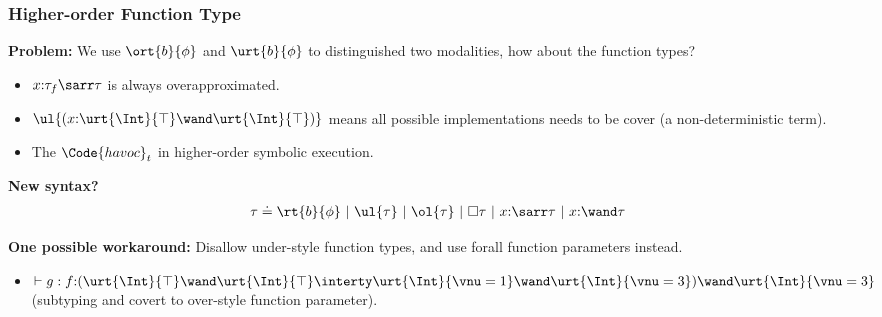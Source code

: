 \begin{frame}[fragile]
    \frametitle{Higher-order Function Type}

\textbf{Problem:} We use $\ort{b}{\phi}$ and $\urt{b}{\phi}$ to distinguished two modalities, how about the function types?

\begin{itemize}
    \item $x{:}\tau_f\sarr\tau$ is always overapproximated.
    \item $\ul{(x{:}\urt{\Int}{\top}\wand\urt{\Int}{\top})}$ means all possible implementations needs to be cover (a non-deterministic term).
    \item The $\Code{havoc}_{t}$ in higher-order symbolic execution.
\end{itemize}

\textbf{New syntax?}
\begin{align*}
    \tau \doteq \rt{b}{\phi} ~|~ \ul{\tau} ~|~ \ol{\tau} ~|~ \Box \tau ~|~ x{:}\sarr\tau ~|~ x{:}\wand\tau
\end{align*}

\textbf{One possible workaround:} Disallow under-style function types, and use forall function parameters instead.
\begin{itemize}
    \item $\vdash g : f{:}(\urt{\Int}{\top} \wand \urt{\Int}{\top} \interty \urt{\Int}{\vnu = 1} \wand \urt{\Int}{\vnu = 3}) \wand \urt{\Int}{\vnu = 3}$ (subtyping and covert to over-style function parameter).
\end{itemize}
    
\end{frame}





